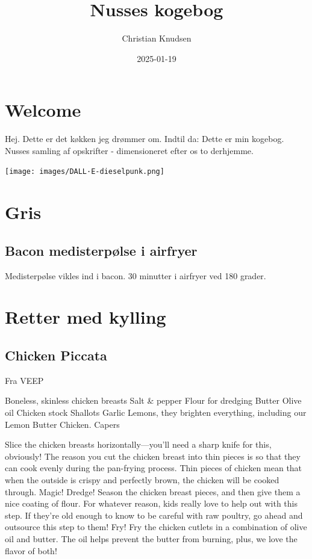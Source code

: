 \documentclass[
]{book}
\title{Nusses kogebog}
\author{Christian Knudsen}
\date{2025-01-19}
\begin{document}
\maketitle

{
\setcounter{tocdepth}{1}
\tableofcontents
}
\hypertarget{welcome}{%
\chapter{Welcome}\label{welcome}}

Hej. Dette er det køkken jeg drømmer om. Indtil da:
Dette er min kogebog. Nusses samling af opskrifter - dimensioneret efter os to derhjemme.

\texttt{[image: images/DALL·E-dieselpunk.png]}

\hypertarget{gris}{%
\chapter{Gris}\label{gris}}

\hypertarget{bacon-medisterpuxf8lse-i-airfryer}{%
\section{Bacon medisterpølse i airfryer}\label{bacon-medisterpuxf8lse-i-airfryer}}

Medisterpølse vikles ind i bacon.
30 minutter i airfryer ved 180 grader.

\hypertarget{retter-med-kylling}{%
\chapter{Retter med kylling}\label{retter-med-kylling}}

\hypertarget{chicken-piccata}{%
\section{Chicken Piccata}\label{chicken-piccata}}

Fra VEEP

Boneless, skinless chicken breasts
Salt \& pepper
Flour for dredging
Butter
Olive oil
Chicken stock
Shallots
Garlic
Lemons, they brighten everything, including our Lemon Butter Chicken.
Capers

Slice the chicken breasts horizontally---you'll need a sharp knife for this, obviously! The reason you cut the chicken breast into thin pieces is so that they can cook evenly during the pan-frying process. Thin pieces of chicken mean that when the outside is crispy and perfectly brown, the chicken will be cooked through. Magic!
Dredge! Season the chicken breast pieces, and then give them a nice coating of flour. For whatever reason, kids really love to help out with this step. If they're old enough to know to be careful with raw poultry, go ahead and outsource this step to them!
Fry! Fry the chicken cutlets in a combination of olive oil and butter. The oil helps prevent the butter from burning, plus, we love the flavor of both!
\end{document}

